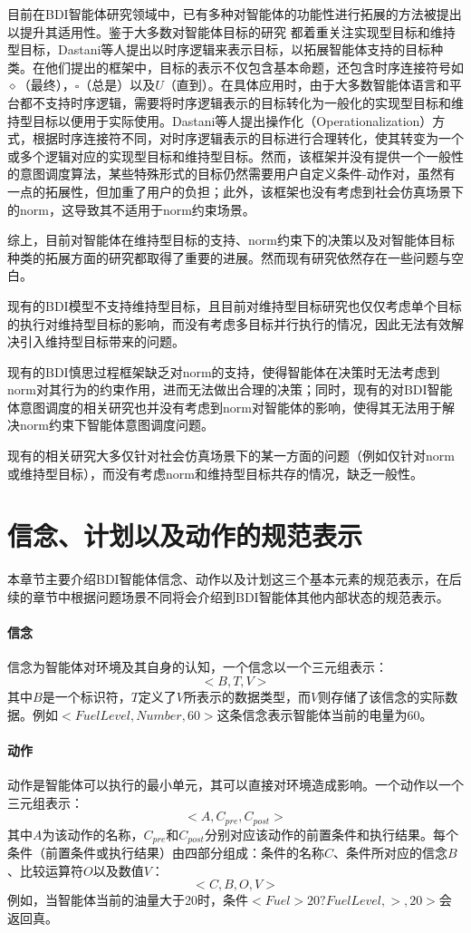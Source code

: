 目前在BDI智能体研究领域中，已有多种对智能体的功能性进行拓展的方法被提出以提升其适用性。鉴于大多数对智能体目标的研究 都着重关注实现型目标和维持型目标，Dastani等人\cite{DBLP:conf/atal/DastaniRW11}提出以时序逻辑来表示目标，以拓展智能体支持的目标种类。在他们提出的框架中，目标的表示不仅包含基本命题，还包含时序连接符号如$\diamond$（最终），$\square$（总是）以及$U$（直到）。在具体应用时，由于大多数智能体语言和平台都不支持时序逻辑，需要将时序逻辑表示的目标转化为一般化的实现型目标和维持型目标以便用于实际使用。Dastani等人提出操作化（Operationalization）方式，根据时序连接符不同，对时序逻辑表示的目标进行合理转化，使其转变为一个或多个逻辑对应的实现型目标和维持型目标。然而，该框架并没有提供一个一般性的意图调度算法，某些特殊形式的目标仍然需要用户自定义条件-动作对，虽然有一点的拓展性，但加重了用户的负担；此外，该框架也没有考虑到社会仿真场景下的norm，这导致其不适用于norm约束场景。

综上，目前对智能体在维持型目标的支持、norm约束下的决策以及对智能体目标种类的拓展方面的研究都取得了重要的进展。然而现有研究依然存在一些问题与空白。

现有的BDI模型不支持维持型目标，且目前对维持型目标研究也仅仅考虑单个目标的执行对维持型目标的影响，而没有考虑多目标并行执行的情况，因此无法有效解决引入维持型目标带来的问题。

现有的BDI慎思过程框架缺乏对norm的支持，使得智能体在决策时无法考虑到norm对其行为的约束作用，进而无法做出合理的决策；同时，现有的对BDI智能体意图调度的相关研究也并没有考虑到norm对智能体的影响，使得其无法用于解决norm约束下智能体意图调度问题。

现有的相关研究大多仅针对社会仿真场景下的某一方面的问题（例如仅针对norm或维持型目标），而没有考虑norm和维持型目标共存的情况，缺乏一般性。

\section{信念、计划以及动作的规范表示}
本章节主要介绍BDI智能体信念、动作以及计划这三个基本元素的规范表示，在后续的章节中根据问题场景不同将会介绍到BDI智能体其他内部状态的规范表示。
\paragraph{信念}
信念为智能体对环境及其自身的认知，一个信念以一个三元组表示：
$$<B,T,V>$$
其中$B$是一个标识符，$T$定义了$V$所表示的数据类型，而$V$则存储了该信念的实际数据。例如$<FuelLevel,Number,60>$这条信念表示智能体当前的电量为60。
\paragraph{动作}
动作是智能体可以执行的最小单元，其可以直接对环境造成影响。一个动作以一个三元组表示：
$$<A,C_{pre},C_{post}>$$
其中$A$为该动作的名称，$C_{pre}$和$C_{post}$分别对应该动作的前置条件和执行结果。每个条件（前置条件或执行结果）由四部分组成：条件的名称$C$、条件所对应的信念$B$、比较运算符$O$以及数值$V$：
$$<C,B,O,V>$$
例如，当智能体当前的油量大于20时，条件$<Fuel>20? FuelLevel,>,20>$会返回真。
